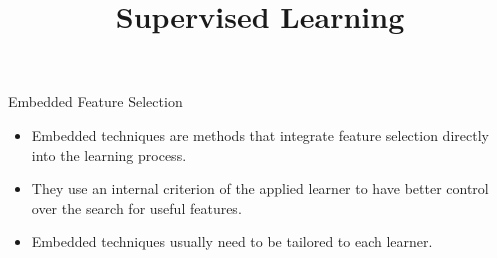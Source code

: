 \documentclass[11pt,compress,t,notes=noshow, xcolor=table]{beamer}
\title{Supervised Learning}
\date{}
\begin{document}

  \begin{vbframe}{Embedded Feature Selection}

    \begin{itemize}
      \item Embedded techniques are methods that integrate feature selection directly into the learning process.
      \item They use an internal criterion of the applied learner to have better control over the search for useful features.
      \item Embedded techniques usually need to be tailored to each learner.
    \end{itemize}
      
  \end{vbframe}
\end{document}
